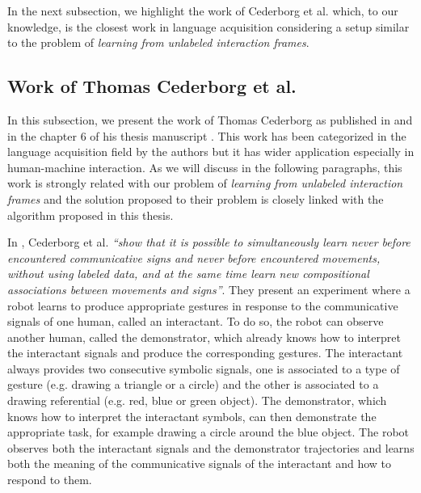 In the next subsection, we highlight the work of Cederborg et al. \cite{cederborg2011imitating} which, to our knowledge, is the closest work in language acquisition considering a setup similar to the problem of \emph{learning from unlabeled interaction frames}. 


\subsection{Work of Thomas Cederborg et al.}
\label{chapter:related:language:thomas}

In this subsection, we present the work of Thomas Cederborg as published in \cite{cederborg2011imitating,cederborg2013language} and in the chapter 6 of his thesis manuscript \cite{cederborg2014thesis}. This work has been categorized in the language acquisition field by the authors but it has wider application especially in human-machine interaction. As we will discuss in the following paragraphs, this work is strongly related with our problem of \emph{learning from unlabeled interaction frames} and the solution proposed to their problem is closely linked with the algorithm proposed in this thesis.

In \cite{cederborg2011imitating}, Cederborg et al. \textit{``show that it is possible to simultaneously learn never before encountered communicative signs and never before encountered movements, without using labeled data, and at the same time learn new compositional associations between movements and signs''}. They present an experiment where a robot learns to produce appropriate gestures in response to the communicative signals of one human, called an interactant. To do so, the robot can observe another human, called the demonstrator, which already knows how to interpret the interactant signals and produce the corresponding gestures. The interactant always provides two consecutive symbolic signals, one is associated to a type of gesture (e.g. drawing a triangle or a circle) and the other is associated to a drawing referential (e.g. red, blue or green object). The demonstrator, which knows how to interpret the interactant symbols, can then demonstrate the appropriate task, for example drawing a circle around the blue object. The robot observes both the interactant signals and the demonstrator trajectories and learns both the meaning of the communicative signals of the interactant and how to respond to them.

